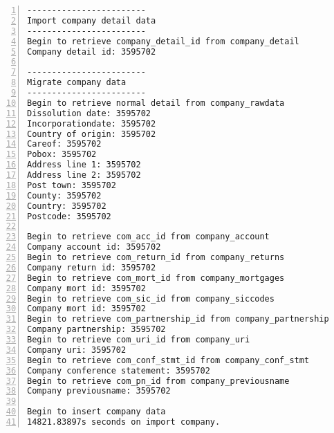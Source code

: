 \begin{lstlisting}[breaklines, frame=single, numbers=left, caption={Execution of Company Migration Program.}, label=commandline-02]
------------------------
Import company detail data 
------------------------
Begin to retrieve company_detail_id from company_detail
Company detail id: 3595702 

------------------------
Migrate company data
------------------------
Begin to retrieve normal detail from company_rawdata
Dissolution date: 3595702 
Incorporationdate: 3595702 
Country of origin: 3595702 
Careof: 3595702 
Pobox: 3595702 
Address line 1: 3595702 
Address line 2: 3595702 
Post town: 3595702 
County: 3595702 
Country: 3595702 
Postcode: 3595702 

Begin to retrieve com_acc_id from company_account
Company account id: 3595702 
Begin to retrieve com_return_id from company_returns
Company return id: 3595702 
Begin to retrieve com_mort_id from company_mortgages
Company mort id: 3595702 
Begin to retrieve com_sic_id from company_siccodes
Company mort id: 3595702 
Begin to retrieve com_partnership_id from company_partnership
Company partnership: 3595702 
Begin to retrieve com_uri_id from company_uri
Company uri: 3595702 
Begin to retrieve com_conf_stmt_id from company_conf_stmt
Company conference statement: 3595702 
Begin to retrieve com_pn_id from company_previousname
Company previousname: 3595702 

Begin to insert company data
14821.83897s seconds on import company. 

\end{lstlisting}






















